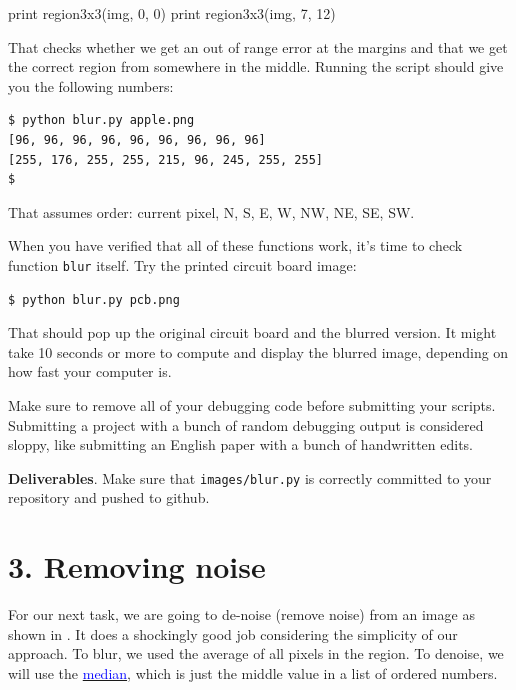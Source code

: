 \begin{pyverbatim}
print region3x3(img, 0, 0)
print region3x3(img, 7, 12)
\end{pyverbatim}

\noindent That checks whether we get an out of range error at the margins and that we get the correct region from somewhere in the middle. Running the script should give you the following numbers:

\begin{lstlisting}[style=BashInputStyle]
$ python blur.py apple.png
[96, 96, 96, 96, 96, 96, 96, 96, 96]
[255, 176, 255, 255, 215, 96, 245, 255, 255]
$ 
\end{lstlisting}

\noindent That assumes order: current pixel, N, S, E, W, NW, NE, SE, SW.

When you have verified that all of these functions work, it's time to check function {\tt blur} itself. Try the printed circuit board image:

\begin{lstlisting}[style=BashInputStyle]
$ python blur.py pcb.png 
\end{lstlisting}

\noindent That should pop up the original circuit board and the blurred version. It might take 10 seconds or more to compute and display the blurred image, depending on how fast your computer is.

\begin{callout}{\bctakecare}
Make sure to remove all of your debugging code before submitting your scripts. Submitting a project with a bunch of random debugging output is considered sloppy, like submitting an English paper with a bunch of handwritten edits.
\end{callout}

\begin{callout}{\bcplume}
{\bf Deliverables}. Make sure that {\tt images/blur.py} is correctly committed to your repository and pushed to github.
\end{callout}

\section{3. Removing noise}

For our next task, we are going to de-noise (remove noise) from an image as shown in . It does a shockingly good job considering the simplicity of our approach. To blur, we used the average of all pixels in the region. To denoise, we will use the \href{http://en.wikipedia.org/wiki/Median}{\textcolor{blue}{median}}, which is just the middle value in a list of ordered numbers.

